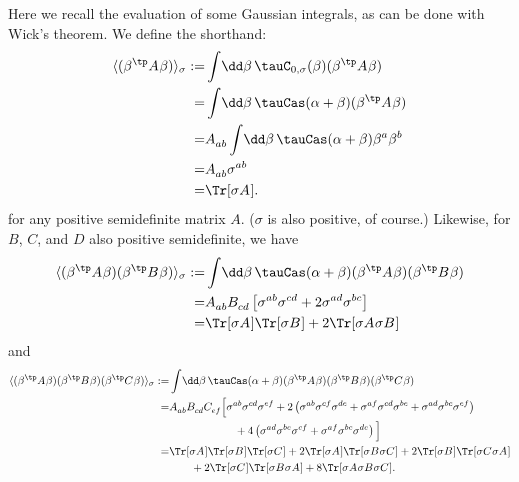 \documentclass{article}
\numberwithin{equation}{section}
\begin{document}
Here we recall the evaluation of some Gaussian integrals, as can be done with Wick's theorem. We define the shorthand:
\begin{align}\begin{split}\label{eq:gaussian-int-cl-2}
		\langle (\beta^\tp A^{} \beta)\rangle_\sigma
		:=& \int \!\dd \beta\, \tauC_{0,\sigma}(\beta)  (\beta^\tp A^{} \beta)\\
		=&\int \!\dd \beta\, \tauCas(\alpha+\beta)  (\beta^\tp A^{} \beta) \\
		=& A^{}_{ab} \int \!\dd \beta\, \tauCas(\alpha+\beta) \beta^a\beta^b\\
		=& A^{}_{ab} \sigma^{ab}  \\
		=& \Tr[\sigma A^{}].
\end{split}\end{align}
for any positive semidefinite matrix $A$. ($\sigma$ is also positive, of course.)  Likewise, for $B$, $C$, and $D$ also positive semidefinite, we have
\begin{align}\begin{split}\label{eq:gaussian-int-cl-4}
		\langle (\beta^\tp A^{} \beta)(\beta^\tp B^{} \beta)\rangle_\sigma
		:=& \int \!\dd \beta\, \tauCas(\alpha+\beta)  (\beta^\tp A^{} \beta)(\beta^\tp B^{} \beta)\\
		= & A^{}_{ab} B^{}_{cd}  \left[\sigma^{ab}\sigma^{cd} + 2\sigma^{ad} \sigma^{bc} \right]\\
		= & \Tr[\sigma A^{}]\Tr[\sigma B^{}] + 2 \Tr[\sigma A^{} \sigma B^{}]
\end{split}\end{align}
and
\begin{align}\begin{split}\label{eq:gaussian-int-cl-6}
		\langle (\beta^\tp A^{} \beta)(\beta^\tp B^{} \beta)(\beta^\tp C^{} \beta)\rangle_\sigma
		:=& \int \!\dd \beta\, \tauCas(\alpha+\beta) (\beta^\tp A^{} \beta)(\beta^\tp B^{} \beta)(\beta^\tp C^{} \beta)
		\\
		=& A^{}_{ab} B^{}_{cd} C^{}_{ef} \Big[\sigma^{ab}\sigma^{cd}\sigma^{ef} +2\left(\sigma^{ab}\sigma^{cf}\sigma^{de} + \sigma^{af}\sigma^{cd}\sigma^{be} + \sigma^{ad}\sigma^{bc}\sigma^{ef}  \right) \\
		&\qquad\qquad\qquad + 4\left(\sigma^{ad}\sigma^{be}\sigma^{cf} + \sigma^{af}\sigma^{bc}\sigma^{de}  \right) \Big]\\
		=& \Tr[\sigma A^{}] \Tr[\sigma B^{}] \Tr[\sigma C^{}] + 2\Tr[\sigma A^{}] \Tr[\sigma B^{} \sigma C^{}] +  2 \Tr[\sigma B^{}] \Tr[\sigma C^{} \sigma A^{}] \\
		&\qquad + 2 \Tr[\sigma C^{}] \Tr[\sigma B^{} \sigma A^{}]
		+ 8 \Tr[\sigma A^{} \sigma B^{} \sigma C^{}] .
\end{split}\end{align}
\end{document}
